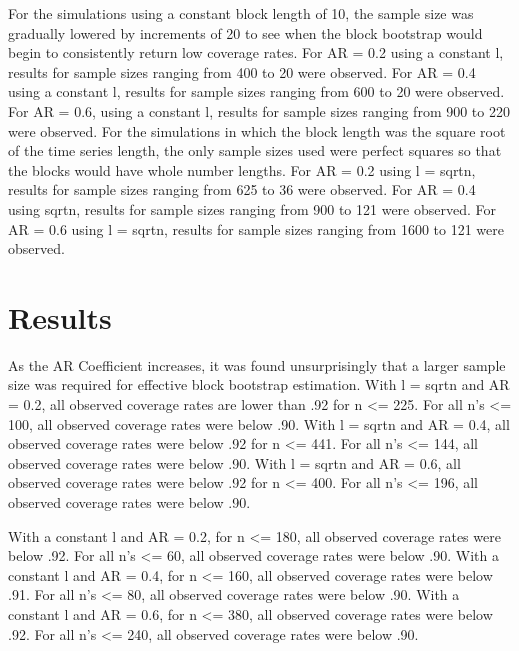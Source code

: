 \documentclass[12pt, letterpaper, titlepage]{article}
\begin{document}
For the simulations using a constant block length of 10, the sample size was gradually lowered by increments of 20 to see when
the block bootstrap would begin to consistently return low coverage rates. For AR = 0.2 using a constant l, results for
sample sizes ranging from 400 to 20 were observed. For AR = 0.4 using a constant l, results for sample sizes ranging from 600
to 20 were observed. For AR = 0.6, using a constant l, results for sample sizes ranging from 900 to 220 were observed. For the simulations in which the block length was the square root of the time series length, the only sample sizes used were perfect squares so that the blocks would have whole number lengths. For AR = 0.2 using l = sqrt{n}, results for sample sizes ranging from 625 to 36 were observed. For AR = 0.4 using sqrt{n}, results for sample sizes ranging from 900 to 121 were observed. For AR = 0.6 using l = sqrt{n}, results for sample sizes ranging from 1600 to 121 were observed. 

\section{Results}

As the AR Coefficient increases, it was found unsurprisingly that a larger sample size was required for effective block bootstrap estimation. With l = sqrt{n} and AR = 0.2, all observed coverage rates are lower than .92 for n <= 225. For all n's <= 100, all observed coverage rates were below .90. With l = sqrt{n} and AR = 0.4, all observed coverage rates were below .92 for n <= 441. For all n's <= 144, all observed coverage rates were below .90. With l = sqrt{n} and AR = 0.6, all observed coverage rates were below .92 for n <= 400. For all n's <= 196, all observed coverage rates were below .90. 

With a constant l and AR = 0.2, for n <= 180, all observed coverage rates were below .92. For all n's <= 60, all observed coverage rates were below .90. With a constant l and AR = 0.4, for n <= 160, all observed coverage rates were below .91. For all n's <= 80, all observed coverage rates were below .90. With a constant l and AR = 0.6, for n <= 380, all observed coverage rates were below .92. For all n's <= 240, all observed coverage rates were below .90.
\end{document}
